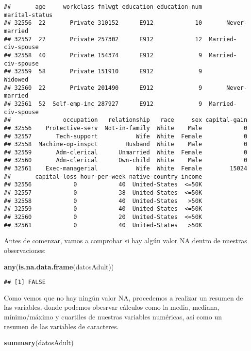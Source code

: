 \documentclass[]{article}
\newenvironment{Shaded}{\begin{snugshade}}{\end{snugshade}}
\newcommand{\KeywordTok}[1]{\textcolor[rgb]{0.13,0.29,0.53}{\textbf{#1}}}
\newcommand{\NormalTok}[1]{#1}
\begin{document}
\begin{verbatim}
##       age     workclass fnlwgt education education-num      marital-status
## 32556  22       Private 310152      E912            10       Never-married
## 32557  27       Private 257302      E912            12  Married-civ-spouse
## 32558  40       Private 154374      E912             9  Married-civ-spouse
## 32559  58       Private 151910      E912             9             Widowed
## 32560  22       Private 201490      E912             9       Never-married
## 32561  52  Self-emp-inc 287927      E912             9  Married-civ-spouse
##               occupation   relationship   race     sex capital-gain
## 32556    Protective-serv  Not-in-family  White    Male            0
## 32557       Tech-support           Wife  White  Female            0
## 32558  Machine-op-inspct        Husband  White    Male            0
## 32559       Adm-clerical      Unmarried  White  Female            0
## 32560       Adm-clerical      Own-child  White    Male            0
## 32561    Exec-managerial           Wife  White  Female        15024
##       capital-loss hour-per-week native-country income
## 32556            0            40  United-States  <=50K
## 32557            0            38  United-States  <=50K
## 32558            0            40  United-States   >50K
## 32559            0            40  United-States  <=50K
## 32560            0            20  United-States  <=50K
## 32561            0            40  United-States   >50K
\end{verbatim}

Antes de comenzar, vamos a comprobar si hay algún valor NA dentro de
nuestras observaciones:

\begin{Shaded}
\begin{Highlighting}[]
\KeywordTok{any}\NormalTok{(}\KeywordTok{is.na.data.frame}\NormalTok{(datosAdult))}
\end{Highlighting}
\end{Shaded}

\begin{verbatim}
## [1] FALSE
\end{verbatim}

Como vemos que no hay ningún valor NA, procedemos a realizar un resumen
de las variables, donde podemos obesrvar cálculos como la media,
mediana, mínimo/máximo y cuartiles de nuestras variables numéricas, así
como un resumen de las variables de caracteres.

\begin{Shaded}
\begin{Highlighting}[]
\KeywordTok{summary}\NormalTok{(datosAdult)}
\end{Highlighting}
\end{Shaded}
\end{document}
